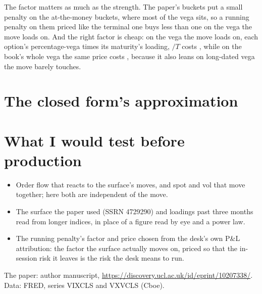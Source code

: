 \documentclass[10pt]{article}
\newcommand{\paper}[1]{#1}  %
\begin{document}
The factor matters as much as the strength. The paper's buckets put a small penalty on the at-the-money buckets, where most of the vega sits, so a running penalty on them priced like the terminal one buys less than one on the vega the move loads on. And the right factor is cheap: on the vega the move loads on, each option's percentage-vega times its maturity's loading, $/T$ costs , while on the book's whole vega the same price costs , because it also leans on long-dated vega the move barely touches.

\section{The closed form's approximation}

\section{What I would test before production}
\begin{itemize}\setlength{\itemsep}{1pt}\setlength{\parskip}{0pt}
\item Order flow that reacts to the surface's moves, and spot and vol that move together; here both are independent of the move.
\item The surface the paper used (\paper{SSRN 4729290}) and loadings past three months read from longer indices, in place of a figure read by eye and a power law.
\item The running penalty's factor and price chosen from the desk's own P\&L attribution: the factor the surface actually moves on, priced so that the in-session risk it leaves is the risk the desk means to run.
\end{itemize}

{\small\color{quiet}The paper: author manuscript, \url{https://discovery.ucl.ac.uk/id/eprint/10207338/}. Data: FRED, series VIXCLS and VXVCLS (Cboe). \par}
\end{document}
